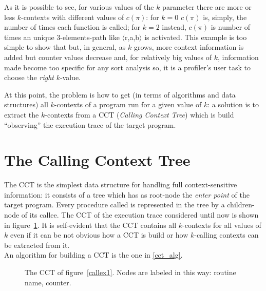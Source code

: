\documentclass[a4paper,10pt]{report}
\begin{document}
As it is possible to see, for various values of the $k$ parameter there are more or less $k$-contexts with different values of $c(\pi)$: for $k=0$ $c(\pi)$ is, simply, the number of times each function is called; for $k=2$ instead, $c(\pi)$ is number of times an unique 3-elements-path like $\langle$r,a,b$\rangle$ is activated. This example is too simple to show that but, in general, as $k$ grows, more context information is added but counter values decrease and, for relatively big values of $k$, information made become too specific for any sort analysis so, it is a profiler's user task to choose the \emph{right} $k$-value.

At this point, the problem is how to get (in terms of algorithms and data
structures) all $k$-contexts of a program run for a given value of $k$: a solution is to extract the $k$-contexts from a CCT (\emph{Calling Context Tree}) which is build
``observing'' the execution trace of the target program.

\section{The Calling Context Tree}

The CCT is the simplest data structure for handling full context-sensitive information: 
it consists of a tree which has as root-node the \emph{enter point} of the target program.
Every procedure called is represented in the tree by a children-node of its callee. 
The CCT of the execution trace considered until now is shown in figure~\ref{cct1}.
It is self-evident that the CCT contains all $k$-contexts for all values of $k$ even if 
it can be not obvious how a CCT is build or how $k$-calling contexts can be extracted from it.\\
An algorithm for building a CCT is the one in \cref{cct_alg}.


\begin{figure}[H]

\begin{center}
\end{center}

\caption{The CCT of figure~\ref{callex1}. Nodes are labeled in this way: routine name, counter.}
\label{cct1}

\end{figure}
\end{document}
